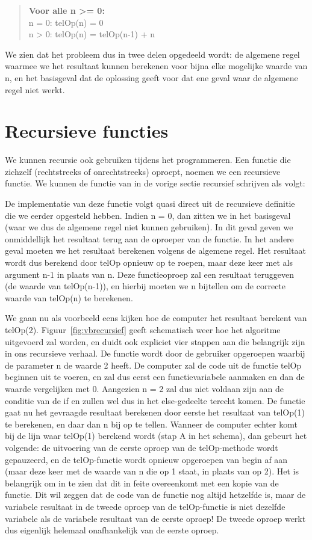 \begin{quote}
\textbf{Voor alle n >= 0:} \\
n = 0:  telOp(n) = 0 \\
n > 0:  telOp(n) = telOp(n-1) + n
\end{quote}

We zien dat het probleem dus in twee delen opgedeeld wordt: de algemene regel waarmee we het resultaat kunnen berekenen voor bijna elke mogelijke waarde van n, en het basisgeval dat de oplossing geeft voor dat ene geval waar de algemene regel niet werkt.

\section{Recursieve functies}
We kunnen recursie ook gebruiken tijdens het programmeren. Een functie die zichzelf (rechtstreeks of onrechtstreeks) oproept, noemen we een recursieve functie. We kunnen de functie van in de vorige sectie recursief schrijven als volgt:


De implementatie van deze functie volgt quasi direct uit de recursieve definitie die we eerder opgesteld hebben. Indien n = 0, dan zitten we in het basisgeval (waar we dus de algemene regel niet kunnen gebruiken). In dit geval geven we onmiddellijk het resultaat terug aan de oproeper van de functie. In het andere geval moeten we het resultaat berekenen volgens de algemene regel. Het resultaat wordt dus berekend door telOp opnieuw op te roepen, maar deze keer met als argument n-1 in plaats van n. Deze functieoproep zal een resultaat teruggeven (de waarde van telOp(n-1)), en hierbij moeten we n bijtellen om de correcte waarde van telOp(n) te berekenen.

We gaan nu als voorbeeld eens kijken hoe de computer het resultaat berekent van telOp(2). Figuur~\ref{fig:vbrecursief} geeft schematisch weer hoe het algoritme uitgevoerd zal worden, en duidt ook expliciet vier stappen aan die belangrijk zijn in ons recursieve verhaal. De functie wordt door de gebruiker opgeroepen waarbij de parameter n de waarde 2 heeft. De computer zal de code uit de functie telOp beginnen uit te voeren, en zal dus eerst een functievariabele aanmaken en dan de waarde vergelijken met 0. Aangezien n = 2 zal dus niet voldaan zijn aan de conditie van de if en zullen wel dus in het else-gedeelte terecht komen. De functie gaat nu het gevraagde resultaat berekenen door eerste het resultaat van telOp(1) te berekenen, en daar dan n bij op te tellen. Wanneer de computer echter komt bij de lijn waar telOp(1) berekend wordt (stap A in het schema), dan gebeurt het volgende: de uitvoering van de eerste oproep van de telOp-methode wordt gepauzeerd, en de telOp-functie wordt opnieuw opgeroepen van begin af aan (maar deze keer met de waarde van n die op 1 staat, in plaats van op 2). Het is belangrijk om in te zien dat dit in feite overeenkomt met een kopie van de functie. Dit wil zeggen dat de code van de functie nog altijd hetzelfde is, maar de variabele resultaat in de tweede oproep van de telOp-functie is niet dezelfde variabele als de variabele resultaat van de eerste oproep! De tweede oproep werkt dus eigenlijk helemaal onafhankelijk van de eerste oproep.

